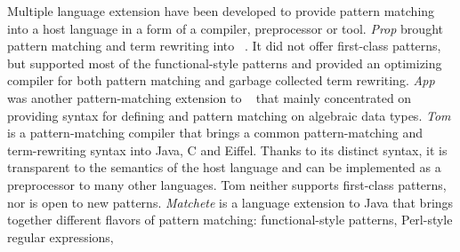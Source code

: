 Multiple language extension have been developed to provide pattern matching into 
a host language in a form of a compiler, preprocessor or tool.
%
\emph{Prop} %
brought pattern matching and term 
rewriting into \Cpp{}~\cite{Prop96}. %
It did not offer 
first-class patterns, but supported most of the functional-style patterns and 
provided an optimizing compiler for both pattern matching and garbage collected 
term rewriting. \emph{App} was another pattern-matching extension to \Cpp{}~\cite{App} 
that mainly concentrated on providing syntax for defining and pattern matching on algebraic data types. 
%
\emph{Tom} is a pattern-matching compiler that %
brings a common 
pattern-matching and term-rewriting syntax into Java, C and Eiffel. %
Thanks to its distinct syntax, it is transparent to the semantics of the host language 
and can be implemented as a preprocessor to many other languages. %
Tom neither supports first-class patterns, nor is open to new patterns. 
%
\emph{Matchete} is a language extension to Java that brings together different flavors 
of pattern matching: functional-style patterns, Perl-style regular expressions, 
